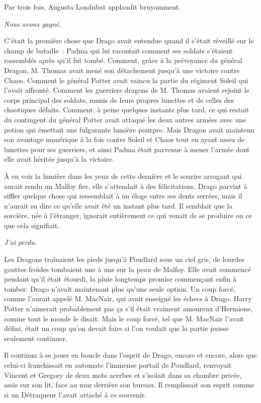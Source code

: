 Par trois fois, Augusta Londubat applaudit bruyamment.

\later

\emph{Nous avons gagné.}

C'était la première chose que Drago avait entendue quand il s'était réveillé sur le champ de bataille~: Padma qui lui racontait comment ses soldats s'étaient rassemblés après qu'il fut tombé. Comment, grâce à la prévoyance du général Dragon, M. Thomas avait mené son détachement jusqu'à une victoire contre Chaos. Comment le général Potter avait vaincu la partie du régiment Soleil qui l'avait affronté. Comment les guerriers dragons de M. Thomas avaient rejoint le corps principal des soldats, munis de leurs propres lunettes et de celles des chaotiques défaits. Comment, à peine quelques instants plus tard, ce qui restait du contingent du général Potter avait attaqué les deux autres armées avec une potion qui émettait une fulgurante lumière pourpre. Mais Dragon avait maintenu son avantage numérique à la fois contre Soleil et Chaos tout en ayant assez de lunettes pour ses guerriers, et ainsi Padma était parvenue à mener l'armée dont elle avait héritée jusqu'à la victoire.

À en voir la lumière dans les yeux de cette dernière et le sourire arrogant qui aurait rendu un Malfoy fier, elle s'attendait à des félicitations. Drago parvint à siffler quelque chose qui ressemblait à un éloge entre ses dents serrées, mais il n'aurait su dire ce qu'elle avait été un instant plus tard. Il semblait que la sorcière, née à l'étranger, ignorait entièrement ce qui venait de se produire ou ce que cela signifiait.

\emph{J'ai perdu.}

Les Dragons traînaient les pieds jusqu'à Poudlard sous un ciel gris, de lourdes gouttes froides tombaient une à une sur la peau de Malfoy. Elle avait commencé pendant qu'il était étourdi, la pluie longtemps promise commençant enfin à tomber. Drago n'avait maintenant plus qu'une seule option. Un coup forcé, comme l'aurait appelé M. MacNair, qui avait enseigné les échecs à Drago. Harry Potter n'aimerait probablement pas ça s'il était vraiment amoureux d'Hermione, comme tout le monde le disait. Mais le coup forcé, tel que M. MacNair l'avait défini, était un coup qu'on devait faire si l'on voulait que la partie puisse seulement continuer.

Il continua à se jouer en boucle dans l'esprit de Drago, encore et encore, alors que celui-ci franchissait en automate l'immense portail de Poudlard, renvoyait Vincent et Gregory de deux mots acerbes et s'isolait dans sa chambre privée, assis sur son lit, face au mur derrière son bureau. Il remplissait son esprit comme si un Détraqueur l'avait attaché à ce souvenir.

